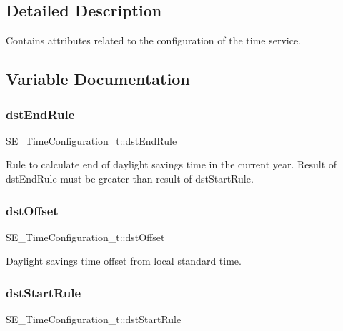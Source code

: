 \subsection{Detailed Description}
Contains attributes related to the configuration of the time service. 

\subsection{Variable Documentation}
\mbox{\label{group__TimeConfiguration_gae87e7c6824261a50cda64560ae33fa4b}} 
\subsubsection{\texorpdfstring{dst\+End\+Rule}{dstEndRule}}
{\footnotesize\ttfamily S\+E\+\_\+\+Time\+Configuration\+\_\+t\+::dst\+End\+Rule}

Rule to calculate end of daylight savings time in the current year. Result of dst\+End\+Rule must be greater than result of dst\+Start\+Rule. \mbox{\label{group__TimeConfiguration_ga3bb6651aeebc25b17fbcd004bb0a5ffc}} 
\subsubsection{\texorpdfstring{dst\+Offset}{dstOffset}}
{\footnotesize\ttfamily S\+E\+\_\+\+Time\+Configuration\+\_\+t\+::dst\+Offset}

Daylight savings time offset from local standard time. \mbox{\label{group__TimeConfiguration_gaa5bec33fb7f397915e1c59e039876bb0}} 
\subsubsection{\texorpdfstring{dst\+Start\+Rule}{dstStartRule}}
{\footnotesize\ttfamily S\+E\+\_\+\+Time\+Configuration\+\_\+t\+::dst\+Start\+Rule}

